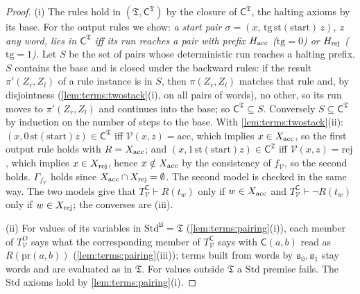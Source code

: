 \begin{proof}
(i) The rules hold in $(\mathfrak T,\mathsf C^{\mathfrak T})$ by the closure of $\mathsf C^{\mathfrak T}$, the halting axioms by its base. For the output rules we show: \emph{a start pair $\sigma=(x,\,\mathrm{tg}\,\mathrm{st}(\mathrm{start})\,z)$, $z$ any word, lies in $\mathsf C^{\mathfrak T}$ iff its run reaches a pair with prefix $H_{\rm acc}$ ($\mathrm{tg}=0$) or $H_{\rm rej}$ ($\mathrm{tg}=1$).} Let $S$ be the set of pairs whose deterministic run reaches a halting prefix. $S$ contains the base and is closed under the backward rules: if the result $\pi'(Z_r,Z_l)$ of a rule instance is in $S$, then $\pi(Z_r,Z_l)$ matches that rule and, by disjointness (\cref{lem:terms:twostack}(i), on all pairs of words), no other, so its run moves to $\pi'(Z_r,Z_l)$ and continues into the base; so $\mathsf C^{\mathfrak T}\subseteq S$. Conversely $S\subseteq\mathsf C^{\mathfrak T}$ by induction on the number of steps to the base. With \cref{lem:terms:twostack}(ii): $(x,0\,\mathrm{st}(\mathrm{start})z)\in\mathsf C^{\mathfrak T}$ iff $\mathcal V(x,z)=\mathrm{acc}$, which implies $x\in X_{\rm acc}$, so the first output rule holds with $R=X_{\rm acc}$; and $(x,1\,\mathrm{st}(\mathrm{start})z)\in\mathsf C^{\mathfrak T}$ iff $\mathcal V(x,z)=\mathrm{rej}$, which implies $x\in X_{\rm rej}$, hence $x\notin X_{\rm acc}$ by the consistency of $f_{\mathcal V}$, so the second holds. $\Gamma_{f_{\mathcal V}}$ holds since $X_{\rm acc}\cap X_{\rm rej}=\emptyset$. The second model is checked in the same way. The two models give that $T^{\mathsf C}_{\mathcal V}\vdash R(t_w)$ only if $w\in X_{\rm acc}$ and $T^{\mathsf C}_{\mathcal V}\vdash\neg R(t_w)$ only if $w\in X_{\rm rej}$; the converses are (iii).

(ii) For values of its variables in $\mathrm{Std}^{\mathfrak U}=\mathfrak T$ (\cref{lem:terms:pairing}(i)), each member of $T^O_{\mathcal V}$ says what the corresponding member of $T^{\mathsf C}_{\mathcal V}$ says with $\mathsf C(a,b)$ read as $R(\mathrm{pr}(a,b))$ (\cref{lem:terms:pairing}(iii)); terms built from words by $\mathtt s_0,\mathtt s_1$ stay words and are evaluated as in $\mathfrak T$. For values outside $\mathfrak T$ a $\mathrm{Std}$ premise fails. The $\mathrm{Std}$ axioms hold by \cref{lem:terms:pairing}(i).


\end{proof}
